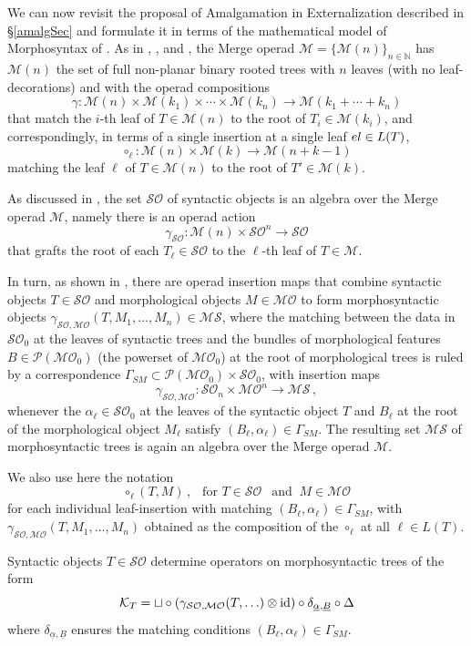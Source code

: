\documentclass[12pt]{amsart}
\numberwithin{equation}{section}
\def\N{{\mathbb N}}
\def\cK{{\mathcal K}}
\def\cM{{\mathcal M}}
\def\cO{{\mathcal O}}
\def\cP{{\mathcal P}}
\def\cS{{\mathcal S}}
\begin{document}
\medskip

We can now revisit the proposal of Amalgamation in Externalization described in  \S \ref{amalgSec}
and formulate it in terms of the mathematical model of Morphosyntax of \cite{SentMar}. As in \cite{MCB},
\cite{MHL}, and \cite{SentMar}, the Merge operad $\cM =\{ \cM(n) \}_{n\in \N}$ has $\cM(n)$ the set
of full non-planar binary rooted trees with $n$ leaves (with no leaf-decorations) and with the operad compositions
$$ \gamma: \cM(n) \times \cM(k_1)\times \cdots \times \cM(k_n) \to \cM(k_1+\cdots+ k_n) $$
that match the $i$-th leaf of $T\in \cM(n)$ to the root of $T_i\in \cM(k_i)$, and correspondingly,
in terms of a single insertion at a single leaf $e\\l \in L(T)$,
$$ \circ_\ell : \cM(n) \times \cM(k) \to \cM(n+k-1) $$
matching the leaf $\ell$ of $T\in \cM(n)$ to the root of $T'\in \cM(k)$. 

As discussed in \cite{MCB}, the set $\cS\cO$ of syntactic objects is an algebra over the Merge operad $\cM$, namely
there is an operad action
$$ \gamma_{\cS\cO}: \cM(n) \times \cS\cO^n \to \cS\cO $$
that grafts the root of each $T_\ell \in \cS\cO$ to the $\ell$-th leaf of $T\in \cM$. 

In turn, as shown in \cite{SentMar}, there are operad insertion maps that combine
syntactic objects $T\in \cS\cO$ and morphological objects $M\in \cM\cO$ to form 
morphosyntactic objects $\gamma_{\cS\cO, \cM\cO}(T,M_1,\ldots, M_n)\in \cM\cS$, where
the matching between the data in $\cS\cO_0$ at the leaves of syntactic trees and
the bundles of morphological features $B\in \cP(\cM\cO_0)$ (the powerset of $\cM\cO_0$) 
at the root of morphological trees is  ruled by a correspondence $\Gamma_{SM}\subset \cP(\cM\cO_0)\times \cS\cO_0$, 
with insertion maps
$$ \gamma_{\cS\cO, \cM\cO}: \cS\cO_n \times \cM\cO^n \to \cM\cS \, , $$
whenever the $\alpha_\ell\in \cS\cO_0$ at the leaves of the syntactic object $T$
and $B_\ell$ at the root of the morphological object $M_\ell$ satisfy $(B_\ell, \alpha_\ell)\in \Gamma_{SM}$. 
The resulting set $\cM\cS$ of morphosyntactic trees is again an algebra over the Merge operad $\cM$.

We also use here the notation
$$ \circ_\ell (T, M) \, , \ \ \text{ for } T\in \cS\cO \ \ \text{ and } \  M\in \cM\cO $$
for each individual leaf-insertion with matching $(B_\ell,\alpha_\ell)\in \Gamma_{SM}$,
with $\gamma_{\cS\cO, \cM\cO}(T,M_1,\ldots, M_n)$ obtained as the composition of the $\circ_\ell$
at all $\ell\in L(T)$. 

Syntactic objects $T\in \cS\cO$ determine operators on morphosyntactic trees of the form
$$ \cK_T= \sqcup \circ (\gamma_{\cS\cO, \cM\cO}(T,\ldots) \otimes {\rm id}) \circ \delta_{\underline{\alpha},\underline{B}} \circ \Delta $$
where $\delta_{\underline{\alpha},\underline{B}}$ ensures the matching conditions $(B_\ell, \alpha_\ell)\in \Gamma_{SM}$.
\end{document}
